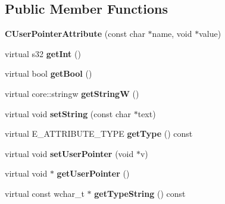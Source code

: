 \subsection*{Public Member Functions}
\begin{DoxyCompactItemize}
\item 
\hypertarget{classirr_1_1io_1_1_c_user_pointer_attribute_a5f241e8a3b33c4701d90d78066a7b83b}{{\bfseries C\-User\-Pointer\-Attribute} (const char $\ast$name, void $\ast$value)}\label{classirr_1_1io_1_1_c_user_pointer_attribute_a5f241e8a3b33c4701d90d78066a7b83b}

\item 
\hypertarget{classirr_1_1io_1_1_c_user_pointer_attribute_a562cd84f3c29474a533eefb743faf48c}{virtual s32 {\bfseries get\-Int} ()}\label{classirr_1_1io_1_1_c_user_pointer_attribute_a562cd84f3c29474a533eefb743faf48c}

\item 
\hypertarget{classirr_1_1io_1_1_c_user_pointer_attribute_a8324fd819c6bc1f7aaf1f0e954df0e68}{virtual bool {\bfseries get\-Bool} ()}\label{classirr_1_1io_1_1_c_user_pointer_attribute_a8324fd819c6bc1f7aaf1f0e954df0e68}

\item 
\hypertarget{classirr_1_1io_1_1_c_user_pointer_attribute_af08b0892a0033121533e78bed6f85962}{virtual core\-::stringw {\bfseries get\-String\-W} ()}\label{classirr_1_1io_1_1_c_user_pointer_attribute_af08b0892a0033121533e78bed6f85962}

\item 
\hypertarget{classirr_1_1io_1_1_c_user_pointer_attribute_a0e5c43427d5e17be61a67c46b76975fb}{virtual void {\bfseries set\-String} (const char $\ast$text)}\label{classirr_1_1io_1_1_c_user_pointer_attribute_a0e5c43427d5e17be61a67c46b76975fb}

\item 
\hypertarget{classirr_1_1io_1_1_c_user_pointer_attribute_ae7463d21e5b453f9c3a94339c8bee834}{virtual E\-\_\-\-A\-T\-T\-R\-I\-B\-U\-T\-E\-\_\-\-T\-Y\-P\-E {\bfseries get\-Type} () const }\label{classirr_1_1io_1_1_c_user_pointer_attribute_ae7463d21e5b453f9c3a94339c8bee834}

\item 
\hypertarget{classirr_1_1io_1_1_c_user_pointer_attribute_a5a916327bc33f23ab2a66f47bea37a63}{virtual void {\bfseries set\-User\-Pointer} (void $\ast$v)}\label{classirr_1_1io_1_1_c_user_pointer_attribute_a5a916327bc33f23ab2a66f47bea37a63}

\item 
\hypertarget{classirr_1_1io_1_1_c_user_pointer_attribute_a5090c18683e1ab21524701a6a61cdca5}{virtual void $\ast$ {\bfseries get\-User\-Pointer} ()}\label{classirr_1_1io_1_1_c_user_pointer_attribute_a5090c18683e1ab21524701a6a61cdca5}

\item 
\hypertarget{classirr_1_1io_1_1_c_user_pointer_attribute_aa287571a170fb4a9a4ba0467efa8b7c0}{virtual const wchar\-\_\-t $\ast$ {\bfseries get\-Type\-String} () const }\label{classirr_1_1io_1_1_c_user_pointer_attribute_aa287571a170fb4a9a4ba0467efa8b7c0}

\end{DoxyCompactItemize}
